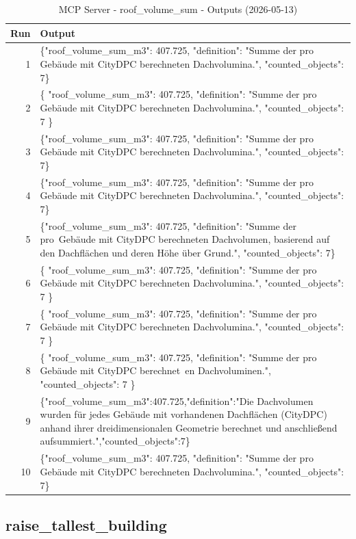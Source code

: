 \documentclass[a4paper,11pt]{article}
\begin{document}
\begin{table}[ht]
\centering
\scriptsize
\caption{MCP Server - roof\_volume\_sum - Outputs (2026-05-13)}
\label{tab:mcp\_roof\_volume\_sum\_outputs\_2026-05-13}
\begin{tabular}{r p{12cm}}
\hline
Run & Output \\
\hline
1 & \{"roof\_volume\_sum\_m3": 407.725, "definition": "Summe der pro Gebäude mit CityDPC berechneten Dachvolumina.", "counted\_objects": 7\} \\
2 & \{
  "roof\_volume\_sum\_m3": 407.725,
  "definition": "Summe der pro Gebäude mit CityDPC berechneten Dachvolumina.",
  "counted\_objects": 7
\} \\
3 & \{"roof\_volume\_sum\_m3": 407.725, "definition": "Summe der pro Gebäude mit CityDPC berechneten Dachvolumina.", "counted\_objects": 7\} \\
4 & \{"roof\_volume\_sum\_m3": 407.725, "definition": "Summe der pro Gebäude mit CityDPC berechneten Dachvolumina.", "counted\_objects": 7\} \\
5 & \{"roof\_volume\_sum\_m3": 407.725, "definition": "Summe der pro Gebäude mit CityDPC berechnet­en Dachvolumen, basierend auf den Dachflächen und deren Höhe über Grund.", "counted\_objects": 7\} \\
6 & \{
  "roof\_volume\_sum\_m3": 407.725,
  "definition": "Summe der pro Gebäude mit CityDPC berechneten Dachvolumina.",
  "counted\_objects": 7
\} \\
7 & \{
  "roof\_volume\_sum\_m3": 407.725,
  "definition": "Summe der pro Gebäude mit CityDPC berechneten Dachvolumina.",
  "counted\_objects": 7
\} \\
8 & \{
  "roof\_volume\_sum\_m3": 407.725,
  "definition": "Summe der pro Gebäude mit CityDPC berechnet en Dachvoluminen.",
  "counted\_objects": 7
\} \\
9 & \{"roof\_volume\_sum\_m3":407.725,"definition":"Die Dachvolumen wurden für jedes Gebäude mit vorhandenen Dachflächen (CityDPC) anhand ihrer dreidimensionalen Geometrie berechnet und anschließend aufsummiert.","counted\_objects":7\} \\
10 & \{"roof\_volume\_sum\_m3": 407.725, "definition": "Summe der pro Gebäude mit CityDPC berechneten Dachvolumina.", "counted\_objects": 7\} \\
\hline
\end{tabular}
\end{table}

\clearpage
\subsection{raise\_tallest\_building}
\end{document}
